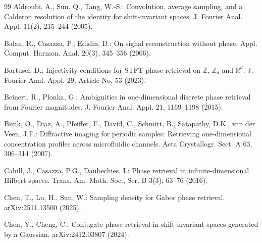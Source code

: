 \documentclass[11pt, reqno]{amsart}
\newcommand{\Z}{\mathbb{Z}}
\newcommand{\R}{\mathbb{R}}
\numberwithin{equation}{section}
\begin{document}
\begin{thebibliography}{99}
	Aldroubi, A., Sun, Q., Tang, W.-S.: Convolution, average sampling, and a Calderon resolution of the identity for shift-invariant spaces. J. Fourier Anal. Appl. 11(2), 215--244 (2005).

Balan, R., Casazza, P., Edidin,  D.: On signal reconstruction without phase. Appl. Comput. Harmon. Anal. 20(3), 345--356 (2006).

Bartusel, D.: Injectivity conditions for STFT phase retrieval on $\Z$, $\Z_d$ and $\R^d$. J. Fourier Anal. Appl. 29, Article No. 53 (2023).

Beinert, R., Plonka, G.:  Ambiguities in one-dimensional discrete phase retrieval from Fourier magnitudes. J. Fourier Anal. Appl. 21, 1169--1198 (2015).


	Bunk, O., Diaz, A., Pfeiffer, F., David, C., Schmitt, B., Satapathy, D.K., van der Veen, J.F.: Diffractive imaging for periodic samples: Retrieving one-dimensional concentration profiles across microfluidic channels. Acta Crystallogr. Sect. A 63, 306--314 (2007).

Cahill, J., Casazza, P.G., Daubechies, I.:  Phase retrieval in infinite-dimensional Hilbert spaces. Trans. Am. Math. Soc., Ser. B 3(3), 63--76 (2016).



Chen, T., Lu, H., Sun, W.: Sampling density for Gabor phase retrieval.  arXiv:2511.13500 (2025).


Chen, Y., Cheng, C.: Conjugate phase retrieval in shift-invariant spaces generated by a Gaussian.  arXiv:2412.03807 (2024).


\end{thebibliography}
\end{document}
